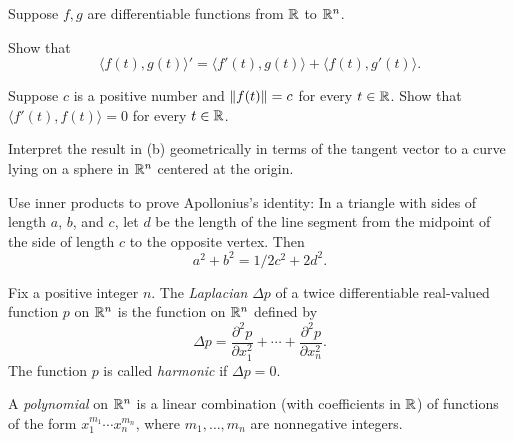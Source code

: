 \begin{exc}
\begin{exercise}
Suppose $f,g$ are differentiable functions from $\mathbb{R}$ to $\mathbb{R}^n$.
\begin{parts}
\item Show that
  \[ \bigl\langle f(t),g(t)\bigr\rangle'
     = \bigl\langle f'(t),g(t)\bigr\rangle+\bigl\langle f(t),g'(t)\bigr\rangle. \]
\item Suppose $c$ is a positive number and $\lVert f(t) \rVert=c$ for every $t\in\mathbb{R}$.
  Show that $\bigl\langle f'(t),f(t)\bigr\rangle=0$ for every $t\in\mathbb{R}$.
\item Interpret the result in (b) geometrically in terms of the tangent vector
  to a curve lying on a sphere in $\mathbb{R}^n$ centered at the origin.
\end{parts}
\end{exercise}

\begin{exercise}
Use inner products to prove Apollonius's identity: In a triangle with sides of
length $a$, $b$, and $c$, let $d$ be the length of the line segment from the
midpoint of the side of length $c$ to the opposite vertex. Then
\[ a^2+b^2 = 1/2c^2+2d^2. \]
\begin{center}
\end{center}
\end{exercise}

\begin{exercise}
Fix a positive integer $n$. The \emph{Laplacian} $\Delta p$ of a twice
differentiable real-valued function $p$ on $\mathbb{R}^n$ is the function on $\mathbb{R}^n$
defined by
\[ \Delta p = \frac{\partial^2p}{\partial x_1^2}+\cdots
   +\frac{\partial^2p}{\partial x_n^2}. \]
The function $p$ is called \emph{harmonic} if $\Delta p=0$.

A \emph{polynomial} on $\mathbb{R}^n$ is a linear combination (with coefficients in
$\mathbb{R}$) of functions of the form $x_1^{m_1}\cdots x_n^{m_n}$, where
$m_1,\dots,m_n$ are nonnegative integers.


\end{exercise}
\end{exc}
